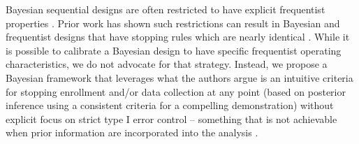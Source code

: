 \documentclass[useAMS,usenatbib,referee]{biom}
\begin{document}
Bayesian sequential designs are often restricted to have explicit frequentist properties \citep{Ventz2015, Zhu2015}. 
Prior work has shown such restrictions can result in Bayesian and frequentist designs that have stopping rules which are 
nearly identical \citep{Stallard2020, Kopp-Schneider2019, Zhu2019}.
While it is possible to calibrate a Bayesian design to have specific frequentist operating characteristics, we do not advocate
for that strategy.
Instead, we propose a Bayesian framework that leverages what the authors argue is an intuitive criteria for stopping enrollment 
and/or data collection at any point (based on posterior inference using a consistent criteria for a compelling demonstration) without 
explicit focus on strict type I error control -- something that is not achievable when prior information are incorporated into 
the analysis \citep{Psioda2018}.
\end{document}

